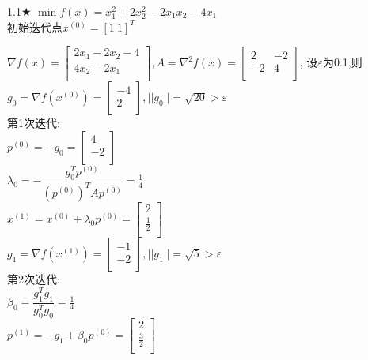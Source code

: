 \begin{problem}{1.1$\bigstar$}
    $\min f(x)=x_1^2+2x_2^2-2x_1x_2-4x_1$\\
    初始迭代点${x^{(0)}}=[1\ 1]^T$
\end{problem}
\begin{solution}
        $\nabla f(x)=\begin{bmatrix}
        2x_1-2x_2-4  \\
        4x_2-2x_1  \\
    \end{bmatrix}, A=\nabla^2 f(x)=\begin{bmatrix}
        2   & -2  \\
        -2  & 4  \\
    \end{bmatrix}$,
    设$\varepsilon$为0.1,则\\
    $g_0=\nabla f(x^{(0)})=\begin{bmatrix} -4\\2\\\end{bmatrix},||g_0||=\sqrt{20}>\varepsilon$\\
    第1次迭代:\\
    $p^{(0)}=-g_0=\begin{bmatrix} 4\\-2\\\end{bmatrix}$\\
    $\lambda_0=-\dfrac{g_0^Tp^{(0)}}{(p^{(0)})^TAp^{(0)}}=\frac{1}{4}$\\
    $x^{(1)}=x^{(0)}+\lambda_0p^{(0)}=\begin{bmatrix} 2\\\frac{1}{2}\\\end{bmatrix}$\\
    $g_1=\nabla f(x^{(1)})=\begin{bmatrix} -1\\-2\\\end{bmatrix},||g_1||=\sqrt{5}>\varepsilon$\\
    第2次迭代:\\
    $\beta_0=\dfrac{g_1^Tg_1}{g_0^Tg_0}=\frac{1}{4}$\\
    $p^{(1)}=-g_1+\beta_0p^{(0)}=\begin{bmatrix} 2\\\frac{3}{2}\\\end{bmatrix}$\\

\end{solution}
